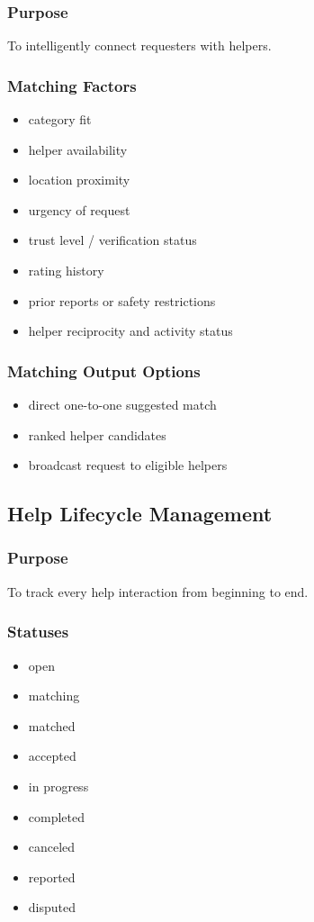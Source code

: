 \documentclass[11pt]{article}
\begin{document}
\subsubsection{Purpose}
To intelligently connect requesters with helpers.

\subsubsection{Matching Factors}
\begin{itemize}[leftmargin=1.5em]
    \item category fit
    \item helper availability
    \item location proximity
    \item urgency of request
    \item trust level / verification status
    \item rating history
    \item prior reports or safety restrictions
    \item helper reciprocity and activity status
\end{itemize}

\subsubsection{Matching Output Options}
\begin{itemize}[leftmargin=1.5em]
    \item direct one-to-one suggested match
    \item ranked helper candidates
    \item broadcast request to eligible helpers
\end{itemize}

\subsection{Help Lifecycle Management}

\subsubsection{Purpose}
To track every help interaction from beginning to end.

\subsubsection{Statuses}
\begin{itemize}[leftmargin=1.5em]
    \item open
    \item matching
    \item matched
    \item accepted
    \item in progress
    \item completed
    \item canceled
    \item reported
    \item disputed
\end{itemize}
\end{document}
